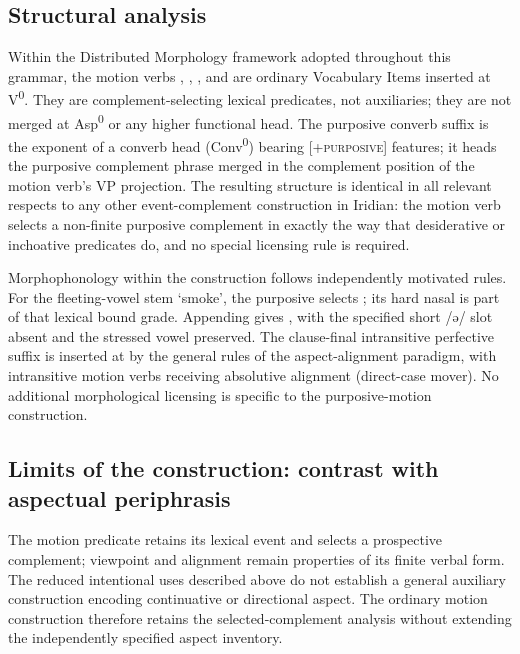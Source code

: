 \subsection{Structural analysis}\label{sec:purp-motion-structure}

Within the Distributed Morphology framework adopted throughout this grammar, the
motion verbs , , , and  are
ordinary Vocabulary Items inserted at V\textsuperscript{0}. They are
complement-selecting lexical predicates, not auxiliaries; they are not merged at
Asp\textsuperscript{0} or any higher functional head. The purposive converb
suffix  is the exponent of a converb head (Conv\textsuperscript{0})
bearing [\textsc{+purposive}] features; it heads the purposive complement phrase
merged in the complement position of the motion verb's VP projection. The
resulting structure is identical in all relevant respects to any other
event-complement construction in Iridian: the motion verb selects a non-finite
purposive complement in exactly the way that desiderative or inchoative
predicates do, and no special licensing rule is required.

Morphophonology within the construction follows independently motivated rules.
For the fleeting-vowel stem  `smoke', the purposive selects
; its hard nasal is part of that lexical bound grade. Appending
 gives , with the specified short  /ə/ slot absent and the
stressed vowel preserved. The clause-final intransitive perfective
suffix  is inserted at
 by the general rules
of the aspect-alignment paradigm, with intransitive motion verbs receiving
absolutive alignment (direct-case mover). No additional morphological licensing
is specific to the purposive-motion construction.

\subsection{Limits of the construction: contrast with aspectual
periphrasis}\label{sec:purp-motion-limits}

The motion predicate retains its lexical event and selects a prospective
complement; viewpoint and alignment remain properties of its finite verbal
form. The reduced intentional uses described above do not establish a general
auxiliary construction encoding continuative or directional aspect. The
ordinary motion construction therefore retains the selected-complement
analysis without extending the independently specified aspect inventory.

